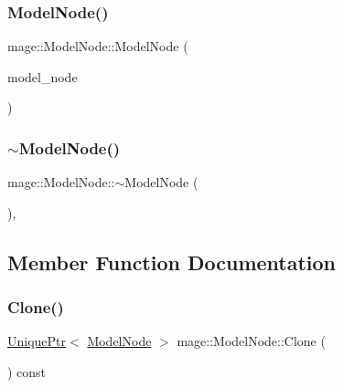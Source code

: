 \hypertarget{classmage_1_1_model_node_a19ba577112ea488f227ea31642fb2cb2}{}\label{classmage_1_1_model_node_a19ba577112ea488f227ea31642fb2cb2} 
\subsubsection{\texorpdfstring{Model\+Node()}{ModelNode()}\hspace{0.1cm}{\footnotesize\ttfamily [3/3]}}
{\footnotesize\ttfamily mage\+::\+Model\+Node\+::\+Model\+Node (\begin{DoxyParamCaption}\item[{\hyperlink{classmage_1_1_model_node}{Model\+Node} \&\&}]{model\+\_\+node }\end{DoxyParamCaption})\hspace{0.3cm}{\ttfamily [default]}}

\hypertarget{classmage_1_1_model_node_a131c0062a1bed3d29fade27e602bec44}{}\label{classmage_1_1_model_node_a131c0062a1bed3d29fade27e602bec44} 
\subsubsection{\texorpdfstring{$\sim$\+Model\+Node()}{~ModelNode()}}
{\footnotesize\ttfamily mage\+::\+Model\+Node\+::$\sim$\+Model\+Node (\begin{DoxyParamCaption}{ }\end{DoxyParamCaption})\hspace{0.3cm}{\ttfamily [virtual]}, {\ttfamily [default]}}



\subsection{Member Function Documentation}
\hypertarget{classmage_1_1_model_node_a766f90e1d626c455ba552a3ded08b948}{}\label{classmage_1_1_model_node_a766f90e1d626c455ba552a3ded08b948} 
\subsubsection{\texorpdfstring{Clone()}{Clone()}}
{\footnotesize\ttfamily \hyperlink{namespacemage_a8c307fbcc33bce9b7f2aa4c26c3b95cf}{Unique\+Ptr}$<$ \hyperlink{classmage_1_1_model_node}{Model\+Node} $>$ mage\+::\+Model\+Node\+::\+Clone (\begin{DoxyParamCaption}{ }\end{DoxyParamCaption}) const}

